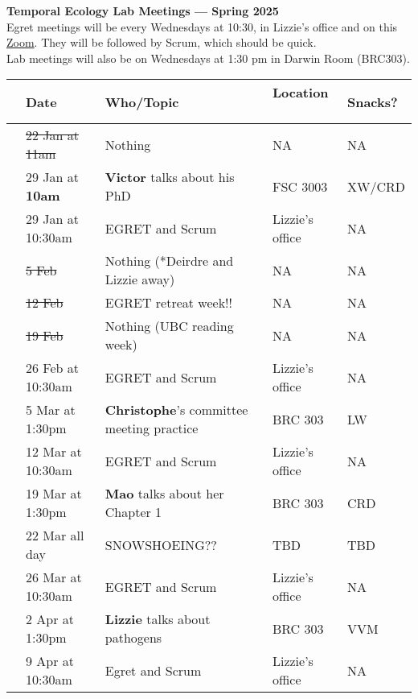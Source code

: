 \documentclass[11pt]{article}
\begin{document}
 
\raggedright
{}

\begin{center} 
{\large \textbf{Temporal Ecology Lab Meetings --- Spring 2025}} \\ [2pt]
Egret meetings will be every Wednesdays at 10:30, in Lizzie's office and on this  \href{https://ubc.zoom.us/j/61453894591?pwd=b2U5MTmUXtOCTKFlBW1s3pBMvHYWP9.1}{Zoom}. They will be followed by Scrum, which should be quick. 
\\ Lab meetings will also be on Wednesdays at 1:30 pm in Darwin Room (BRC303).\\ %
\end{center} 

\begin{center}
\begin{tabular}{ p{0.2 cm}  p{3.2 cm}  p{6 cm}  p{4 cm} p{1.5 cm} }  \hline \hline
 & \textbf{Date}
   & \textbf{Who/Topic}
      & \textbf{Location}  \
            & \textbf{Snacks?}  \\ 
\hline \hline
&\sout{22 Jan at 11am}& Nothing  & NA & NA \\\hline
&29 Jan at \textbf{10am} & \textbf{Victor} talks about his PhD & FSC 3003 & XW/CRD \\\hline
&29 Jan at 10:30am & EGRET and Scrum & Lizzie's office & NA \\\hline
&\sout{5 Feb} & Nothing (*Deirdre and Lizzie away) &NA&NA\\\hline
&\sout{12 Feb} & EGRET retreat week!! & NA &NA \\\hline
&\sout{19 Feb} & Nothing (UBC reading week) &NA& NA \\\hline
&26 Feb at 10:30am & EGRET and Scrum & Lizzie's office & NA \\\hline
&5 Mar at 1:30pm & \textbf{Christophe}'s committee meeting practice  & BRC 303 & LW \\\hline
&12 Mar at 10:30am & EGRET and Scrum& Lizzie's office  &NA \\\hline
&19 Mar at 1:30pm & \textbf{Mao} talks about her Chapter  1 & BRC 303 &  CRD \\\hline
&22 Mar all day & SNOWSHOEING?? & TBD & TBD  \\\hline
&26 Mar at 10:30am & EGRET and Scrum& Lizzie's office  & NA \\\hline
&2 Apr at 1:30pm & \textbf{Lizzie} talks about pathogens & BRC 303 & VVM \\\hline
&9 Apr at 10:30am & Egret and Scrum & Lizzie's office & NA \\\hline
\end{tabular}
\end{center}
\end{document}
